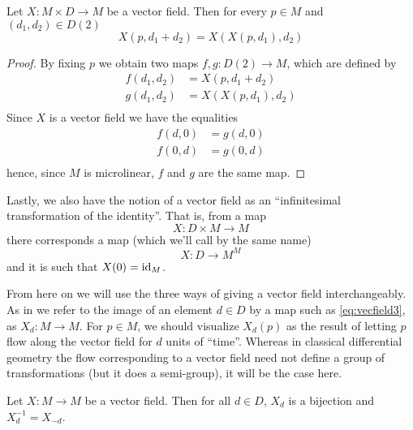 \begin{proposition}
Let \( X:M\times D\to M \) be a vector field. Then for every \( p\in M \) and \( (d_1,d_2)\in D(2) \)
\begin{equation*}
  X(p,d_1+d_2) = X(X(p,d_1),d_2)
\end{equation*}
\label{prop:superpos}
\end{proposition}

\begin{proof}
  By fixing \( p \) we obtain two maps \( f,g:D(2)\to M \), which are defined by
  \begin{align*}
    f(d_1,d_2) &= X(p,d_1+d_2)    \\
    g(d_1,d_2) &= X(X(p,d_1),d_2) \\
  \end{align*}
  Since \( X \) is a vector field we have the equalities
  \begin{align*}
    f(d,0) &= g(d,0) \\
    f(0,d) &= g(0,d) \\
  \end{align*}
  hence, since \( M \) is microlinear, \( f \) and \( g \) are the same map.
\end{proof}

Lastly, we also have the notion of a vector field as an ``infinitesimal transformation of the identity''. That is, from a map
\begin{equation*}
  X:D\times M\to M
\end{equation*}
there corresponds a map (which we'll call by the same name)
\begin{equation}
  X:D\to M^M
  \label{eq:vecfield3}
\end{equation}
and it is such that \( X(0)=\operatorname{id}_M \).

From here on we will use the three ways of giving a vector field interchangeably. As in \cite{lav96} we refer to the image of an element \( d\in D \) by a map such as \ref{eq:vecfield3}, as \( X_d:M\to M \). For \( p\in M \), we should visualize \( X_d(p) \) as the result of letting \( p \) flow along the vector field for \( d \) units of ``time''. Whereas in classical differential geometry the flow corresponding to a vector field need not define a group of transformations (but it does a semi-group), it will be the case here.

\begin{proposition}
  Let \( X:M\to M \) be a vector field. Then for all \( d\in D \), \( X_d \) is a bijection and \( X_d^{-1}=X_{-d} \).
  \label{prop:inftrans}
\end{proposition}

